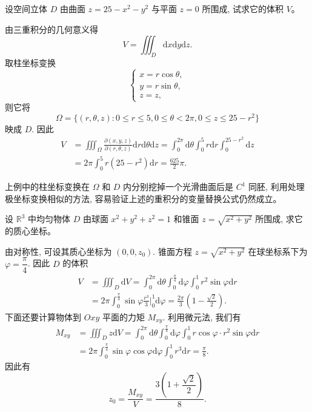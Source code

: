 \documentclass[12pt,fontset=fandol]{ctexart}
\begin{document}
\begin{example}\label{course-example-15-4-6}\quad 设空间立体 $D$ 由曲面 $z=25-x^2-y^2$ 与平面 $z=0$ 所围成, 试求它的体积 $V$。

\end{example}
\begin{solve}\quad 由三重积分的几何意义得
\[
  V=\iiint_D\mathrm dx\mathrm dy\mathrm dz.
\]
取柱坐标变换
\[
  \begin{cases}
    x=r\cos\theta,\\
    y=r\sin\theta,\\
    z=z,
  \end{cases}
\]
则它将
\[
  \Omega=\{(r,\theta,z):0\leqslant r\leqslant5,0\leqslant\theta<2\pi,0\leqslant z\leqslant25-r^2\}
\]
映成 $D$. 因此
\[
\begin{aligned}
  V&=\iiint_\Omega\frac{\partial(x,y,z)}{\partial(r,\theta,z)}
  \mathrm dr\mathrm d\theta\mathrm dz
  =\int_0^{2\pi}\mathrm d\theta\int_0^5 r\mathrm dr\int_0^{25-r^2}\mathrm dz\\
  &=2\pi\int_0^5 r(25-r^2)\mathrm dr=\frac{625}2\pi.
\end{aligned}
\]

\end{solve}
\begin{remark}\quad 上例中的柱坐标变换在 $\Omega$ 和 $D$ 内分别挖掉一个光滑曲面后是 $C^1$ 同胚, 利用处理极坐标变换相似的方法, 容易验证上述的重积分的变量替换公式仍然成立。

\end{remark}
\begin{example}\label{course-example-15-4-7}\quad 设 $\mathbb R^3$ 中均匀物体 $D$ 由球面 $x^2+y^2+z^2=1$ 和锥面 $z=\sqrt{x^2+y^2}$ 所围成, 求它的质心坐标。

\end{example}
\begin{solve}\quad 由对称性, 可设其质心坐标为 $(0,0,z_0)$. 锥面方程 $z=\sqrt{x^2+y^2}$ 在球坐标系下为 $\varphi=\dfrac\pi4$. 因此 $D$ 的体积
\[
\begin{aligned}
  V&=\iiint_D\mathrm dV
  =\int_0^{2\pi}\mathrm d\theta\int_0^{\frac\pi4}\mathrm d\varphi\int_0^1 r^2\sin\varphi\mathrm dr\\
  &=2\pi\int_0^{\frac\pi4}\sin\varphi\frac{r^3}3\Big|_0^1\mathrm d\varphi
  =\frac{2\pi}3\left(1-\frac{\sqrt2}2\right).
\end{aligned}
\]
下面还要计算物体到 $Oxy$ 平面的力矩 $M_{xy}$. 利用微元法, 我们有
\[
\begin{aligned}
  M_{xy}&=\iiint_D z\mathrm dV
  =\int_0^{2\pi}\mathrm d\theta\int_0^{\frac\pi4}\mathrm d\varphi\int_0^1
  r\cos\varphi\cdot r^2\sin\varphi\mathrm dr\\
  &=2\pi\int_0^{\frac\pi4}\sin\varphi\cos\varphi\mathrm d\varphi\int_0^1r^3\mathrm dr
  =\frac\pi8.
\end{aligned}
\]
因此有
\[
  z_0=\frac{M_{xy}}V=\frac{3\left(1+\dfrac{\sqrt2}2\right)}8.
\]

\end{solve}
\end{document}
